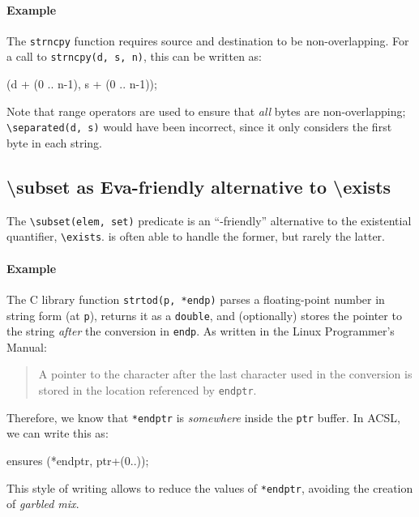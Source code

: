 \documentclass{frama-c-book}
\begin{document}
\paragraph{Example}

The \texttt{strncpy} function requires source and destination to be
non-overlapping. For a call to \verb+strncpy(d, s, n)+, this can be written as:

\begin{listing-nonumber}
  \separated(d + (0 .. n-1), s + (0 .. n-1));
\end{listing-nonumber}

Note that range operators are used to ensure that {\em all} bytes are
non-overlapping; \verb+\separated(d, s)+ would have been incorrect, since it
only considers the first byte in each string.

\subsection*{\textbackslash{}subset as Eva-friendly alternative to \textbackslash{}exists}

The \verb+\subset(elem, set)+ predicate is an ``\Eva{}-friendly'' alternative
to the existential quantifier, \verb+\exists+. \Eva{} is often able to handle the
former, but rarely the latter.

\paragraph{Example}
The C library function \texttt{strtod(p, *endp)} parses a floating-point number
in string form (at \texttt{p}), returns it as a \texttt{double},
and (optionally) stores the pointer to the string {\em after} the conversion in
\texttt{endp}. As written in the Linux Programmer's Manual:

\begin{quote}
  A pointer to the character after the last character used in the conversion
  is stored in the location referenced by \texttt{endptr}.
\end{quote}

Therefore, we know that \texttt{*endptr} is {\em somewhere} inside the
\texttt{ptr} buffer. In ACSL, we can write this as:

\begin{listing-nonumber}
  ensures \subset(*endptr, ptr+(0..));
\end{listing-nonumber}

This style of writing allows \Eva{} to reduce the values of \texttt{*endptr},
avoiding the creation of {\em garbled mix}.
\end{document}
